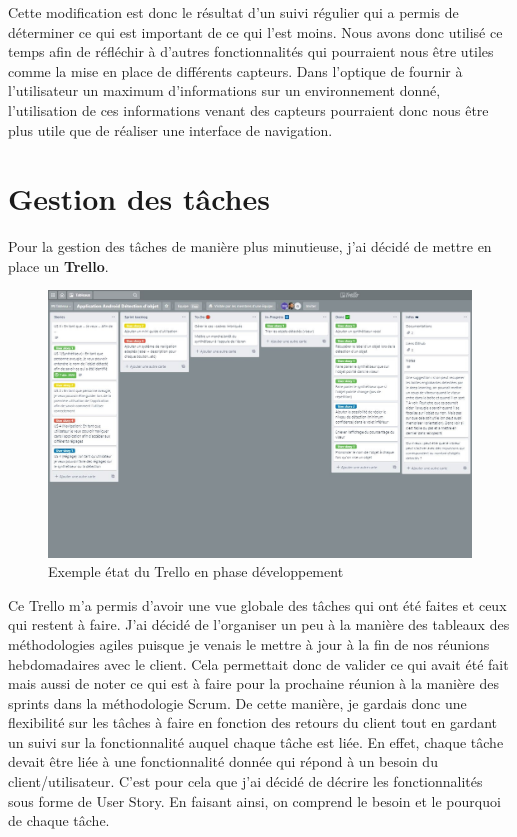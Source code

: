 \documentclass[UTF8]{EPURapport}
\begin{document}
Cette modification est donc le résultat d'un suivi régulier qui a permis de déterminer ce qui est important de ce qui l'est moins. Nous avons donc utilisé ce temps afin de réfléchir à d'autres fonctionnalités qui pourraient nous être utiles comme la mise en place de différents capteurs. Dans l'optique de fournir à l'utilisateur un maximum d'informations sur un environnement donné, l'utilisation de ces informations venant des capteurs pourraient donc nous être plus utile que de réaliser une interface de navigation. 

\section{Gestion des tâches}

Pour la gestion des tâches de manière plus minutieuse, j'ai décidé de mettre en place un \textbf{Trello}. \\

\begin{figure}[h!]
\centering
  \includegraphics[width=\textwidth]{images/Trello1.JPG}
  \caption{Exemple état du Trello en phase développement}
  \label{fig:trello}
\end{figure}

Ce Trello m'a permis d'avoir une vue globale des tâches qui ont été faites et ceux qui restent à faire. J'ai décidé de l'organiser un peu à la manière des tableaux des méthodologies agiles puisque je venais le mettre à jour à la fin de nos réunions hebdomadaires avec le client. Cela permettait donc de valider ce qui avait été fait mais aussi de noter ce qui est à faire pour la prochaine réunion à la manière des sprints dans la méthodologie Scrum. De cette manière, je gardais donc une flexibilité sur les tâches à faire en fonction des retours du client tout en gardant un suivi sur la fonctionnalité auquel chaque tâche est liée. En effet, chaque tâche devait être liée à une fonctionnalité donnée qui répond à un besoin du client/utilisateur. C'est pour cela que j'ai décidé de décrire les fonctionnalités sous forme de User Story. En faisant ainsi, on comprend le besoin et le pourquoi de chaque tâche.\\
\end{document}
